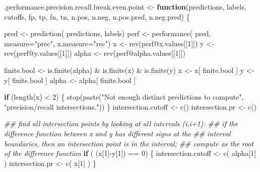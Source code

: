 \documentclass[
  letterpaper,
  DIV=11,
  numbers=noendperiod]{scrartcl}
\newenvironment{Shaded}{\begin{snugshade}}{\end{snugshade}}
\newcommand{\AttributeTok}[1]{\textcolor[rgb]{0.40,0.45,0.13}{#1}}
\newcommand{\ControlFlowTok}[1]{\textcolor[rgb]{0.00,0.23,0.31}{\textbf{#1}}}
\newcommand{\DecValTok}[1]{\textcolor[rgb]{0.68,0.00,0.00}{#1}}
\newcommand{\DocumentationTok}[1]{\textcolor[rgb]{0.37,0.37,0.37}{\textit{#1}}}
\newcommand{\FunctionTok}[1]{\textcolor[rgb]{0.28,0.35,0.67}{#1}}
\newcommand{\NormalTok}[1]{\textcolor[rgb]{0.00,0.23,0.31}{#1}}
\newcommand{\OtherTok}[1]{\textcolor[rgb]{0.00,0.23,0.31}{#1}}
\newcommand{\SpecialCharTok}[1]{\textcolor[rgb]{0.37,0.37,0.37}{#1}}
\newcommand{\StringTok}[1]{\textcolor[rgb]{0.13,0.47,0.30}{#1}}
\begin{document}
\begin{Shaded}
\begin{Highlighting}[]
\NormalTok{.performance.precision.recall.break.even.point }\OtherTok{\textless{}{-}}
  \ControlFlowTok{function}\NormalTok{(predictions, labels, cutoffs, fp, tp, fn, tn,}
\NormalTok{           n.pos, n.neg, n.pos.pred, n.neg.pred) \{}

\NormalTok{      pred }\OtherTok{\textless{}{-}} \FunctionTok{prediction}\NormalTok{( predictions, labels)}
\NormalTok{      perf }\OtherTok{\textless{}{-}} \FunctionTok{performance}\NormalTok{( pred, }\AttributeTok{measure=}\StringTok{"prec"}\NormalTok{, }\AttributeTok{x.measure=}\StringTok{"rec"}\NormalTok{)}
\NormalTok{      x }\OtherTok{\textless{}{-}} \FunctionTok{rev}\NormalTok{(perf}\SpecialCharTok{@}\NormalTok{x.values[[}\DecValTok{1}\NormalTok{]])}
\NormalTok{      y }\OtherTok{\textless{}{-}} \FunctionTok{rev}\NormalTok{(perf}\SpecialCharTok{@}\NormalTok{y.values[[}\DecValTok{1}\NormalTok{]])}
\NormalTok{      alpha }\OtherTok{\textless{}{-}} \FunctionTok{rev}\NormalTok{(perf}\SpecialCharTok{@}\NormalTok{alpha.values[[}\DecValTok{1}\NormalTok{]])}

\NormalTok{      finite.bool }\OtherTok{\textless{}{-}} \FunctionTok{is.finite}\NormalTok{(alpha) }\SpecialCharTok{\&} \FunctionTok{is.finite}\NormalTok{(x) }\SpecialCharTok{\&} \FunctionTok{is.finite}\NormalTok{(y)}
\NormalTok{      x }\OtherTok{\textless{}{-}}\NormalTok{ x[ finite.bool ]}
\NormalTok{      y }\OtherTok{\textless{}{-}}\NormalTok{ y[ finite.bool ]}
\NormalTok{      alpha }\OtherTok{\textless{}{-}}\NormalTok{ alpha[ finite.bool ]}

      \ControlFlowTok{if}\NormalTok{ (}\FunctionTok{length}\NormalTok{(x) }\SpecialCharTok{\textless{}} \DecValTok{2}\NormalTok{) \{}
          \FunctionTok{stop}\NormalTok{(}\FunctionTok{paste}\NormalTok{(}\StringTok{"Not enough distinct predictions to compute"}\NormalTok{,}
                     \StringTok{"precision/recall intersections."}\NormalTok{))}
\NormalTok{      \}}
\NormalTok{      intersection.cutoff }\OtherTok{\textless{}{-}} \FunctionTok{c}\NormalTok{()}
\NormalTok{      intersection.pr }\OtherTok{\textless{}{-}} \FunctionTok{c}\NormalTok{()}
      
      \DocumentationTok{\#\# find all intersection points by looking at all intervals (i,i+1):}
      \DocumentationTok{\#\# if the difference function between x and y has different signs at the}
      \DocumentationTok{\#\# interval boundaries, then an intersection point is in the interval;}
      \DocumentationTok{\#\# compute as the root of the difference function}
      \ControlFlowTok{if}\NormalTok{ ( (x[}\DecValTok{1}\NormalTok{]}\SpecialCharTok{{-}}\NormalTok{y[}\DecValTok{1}\NormalTok{]) }\SpecialCharTok{==} \DecValTok{0}\NormalTok{) \{}
\NormalTok{          intersection.cutoff }\OtherTok{\textless{}{-}} \FunctionTok{c}\NormalTok{( alpha[}\DecValTok{1}\NormalTok{] )}
\NormalTok{          intersection.pr }\OtherTok{\textless{}{-}} \FunctionTok{c}\NormalTok{( x[}\DecValTok{1}\NormalTok{] )}
\NormalTok{      \}}


\end{Highlighting}
\end{Shaded}
\end{document}
